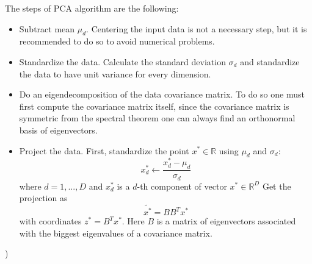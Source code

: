 The steps of PCA algorithm are the following:
\begin{itemize}
    \item Subtract mean $\mu_d$. Centering the input data is not a necessary step, but it is recommended to do so to avoid numerical problems.
    \item Standardize the data. Calculate the standard deviation $\sigma_d$ and standardize the data to have unit variance for every dimension. 
    \item Do an eigendecomposition of the data covariance matrix. To do so one must first compute the covariance matrix itself, since the covariance matrix is symmetric from the spectral theorem one can always find an orthonormal basis of eigenvectors. 
    \item Project the data. First, standardize the point $x^* \in \mathbb{R}$ using $\mu_d$ and $\sigma_d$:
        \begin{equation}
            x^*_d  \leftarrow \frac{x^*_d - \mu_d}{\sigma_d}
        \end{equation}
        where $d = 1, ..., D$ and $x^*_d$ is a $d$-th component of vector $x^* \in \mathbb{R}^D$
    Get the projection as 
    \begin{equation}
        \tilde{x^*} = BB^T x^*
    \end{equation}
    with coordinates $z^* = B^Tx^*$. Here $B$ is a matrix of eigenvectors associated with the biggest eigenvalues of a covariance matrix.
\end{itemize}\cite{mml_book})
